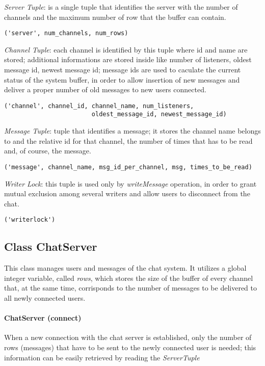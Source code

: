 \documentclass[10pt,a4paper]{article}
\begin{document}
\textit{Server Tuple}: is a single tuple that identifies the server with the number of channels and the maximum number of row that the buffer can contain.

\begin{verbatim}
('server', num_channels, num_rows)
\end{verbatim}


\textit{Channel Tuple}: each channel is identified by this tuple where id and name are stored; additional informations are stored inside like number of listeners, oldest message id, newest message id; message ids are used to caculate the current status of the system buffer, in order to allow insertion of new messages and deliver a proper number of old messages to new users connected. 
\begin{verbatim}
('channel', channel_id, channel_name, num_listeners,
                        oldest_message_id, newest_message_id)
\end{verbatim}

\textit{Message Tuple}: tuple that identifies a message; it stores the channel name belongs to and the relative id for that channel, the number of times that has to be read and, of course, the message.
\begin{verbatim}
('message', channel_name, msg_id_per_channel, msg, times_to_be_read)
\end{verbatim}

\textit{Writer Lock}: this tuple is used only by \textit{writeMessage} operation, in order to grant mutual exclusion among several writers and allow users to disconnect from the chat.
\begin{verbatim}
('writerlock')
\end{verbatim}

\subsection{Class ChatServer}

This class manages users and messages of the chat system. It utilizes a global integer variable, called \textit{rows}, which stores the size of the buffer of every channel that, at the same time, corrisponds to the number of messages to be delivered to all newly connected users.

\paragraph{ChatServer (connect)} When a new connection with the chat server is established, only the number of rows (messages) that have to be sent to the newly connected user is needed; this information can be easily retrieved by reading the \textit{ServerTuple} 
\end{document}

